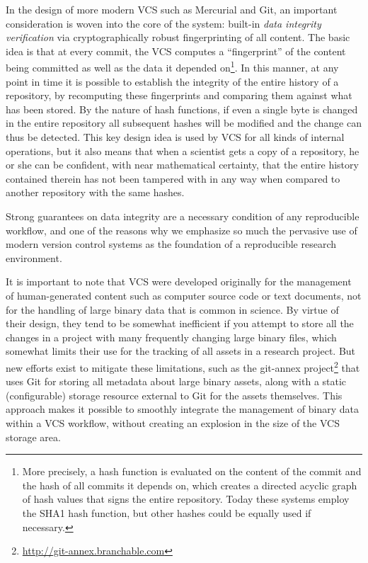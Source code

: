 \documentclass[ChapterTOCs,krantz2]{krantz} %
\begin{document}
In the design of more modern VCS such as Mercurial and Git, an important
consideration is woven into the core of the system: built-in \emph{data
  integrity verification} via cryptographically robust fingerprinting of all
content.  The basic idea is that at every commit, the VCS computes a
``fingerprint'' of the content being committed as well as the data it depended
on\footnote{More precisely, a hash function is evaluated on the content of the
  commit and the hash of all commits it depends on, which creates a directed
  acyclic graph of hash values that signs the entire repository.  Today these
  systems employ the SHA1 hash function, but other hashes could be equally used
  if necessary.}.  In this manner, at any point in time it is possible to
establish the integrity of the entire history of a repository, by recomputing
these fingerprints and comparing them against what has been stored.  By the
nature of hash functions, if even a single byte is changed in the entire
repository all subsequent hashes will be modified and the change can thus be
detected.  This key design idea is used by VCS for all kinds of internal
operations, but it also means that when a scientist gets a copy of a
repository, he or she can be confident, with near mathematical certainty, that
the entire history contained therein has not been tampered with in any way when
compared to another repository with the same hashes.  

Strong guarantees on data integrity are a necessary condition of any
reproducible workflow, and one of the reasons why we emphasize so much the
pervasive use of modern version control systems as the foundation of a
reproducible research environment.

It is important to note that VCS were developed originally for the
management of human-generated content such as computer source code or text
documents, not for the handling of large binary data that is common in science.
By virtue of their design, they tend to be somewhat inefficient if you attempt
to store all the changes in a project with many frequently changing large
binary files, which somewhat limits their use for the tracking of all assets
in a research project.  But new efforts exist to mitigate these limitations,
such as the git-annex project\footnote{\url{http://git-annex.branchable.com}}
that uses Git for storing all metadata about large binary assets, along
with a static (configurable) storage resource external to Git for the assets
themselves.  This approach makes it possible to smoothly integrate the
management of binary data within a VCS workflow, without creating an explosion
in the size of the VCS storage area.
\end{document}
